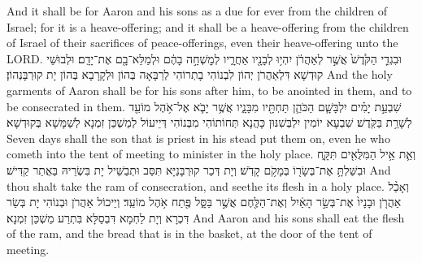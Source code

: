 {{And it shall be for Aaron and his sons as a due for ever from the children of Israel; for it is a heave-offering; and it shall be a heave-offering from the children of Israel of their sacrifices of peace-offerings, even their heave-offering unto the LORD.}{}
{וּבִגְדֵ֤י הַקֹּ֙דֶשׁ֙ אֲשֶׁ֣ר לְאַהֲרֹ֔ן יִהְי֥וּ לְבָנָ֖יו אַחֲרָ֑יו לְמׇשְׁחָ֣ה בָהֶ֔ם וּלְמַלֵּא־בָ֖ם אֶת־יָדָֽם׃
}
{וּלְבוּשֵׁי קוּדְשָׁא דִּלְאַהֲרֹן יְהוֹן לִבְנוֹהִי בָתְרוֹהִי לְרַבָּאָה בְּהוֹן וּלְקָרָבָא בְּהוֹן יָת קוּרְבָּנְהוֹן׃}
{And the holy garments of Aaron shall be for his sons after him, to be anointed in them, and to be consecrated in them.}{}
{שִׁבְעַ֣ת יָמִ֗ים יִלְבָּשָׁ֧ם הַכֹּהֵ֛ן תַּחְתָּ֖יו מִבָּנָ֑יו אֲשֶׁ֥ר יָבֹ֛א אֶל־אֹ֥הֶל מוֹעֵ֖ד לְשָׁרֵ֥ת בַּקֹּֽדֶשׁ׃
}
{שִׁבְעָא יוֹמִין יִלְבְּשִׁנּוּן כָּהֲנָא תְּחוֹתוֹהִי מִבְּנוֹהִי דְּיֵיעוֹל לְמַשְׁכַּן זִמְנָא לְשַׁמָּשָׁא בְּקוּדְשָׁא׃}
{Seven days shall the son that is priest in his stead put them on, even he who cometh into the tent of meeting to minister in the holy place.}{}
{וְאֵ֛ת אֵ֥יל הַמִּלֻּאִ֖ים תִּקָּ֑ח וּבִשַּׁלְתָּ֥ אֶת־בְּשָׂר֖וֹ בְּמָקֹ֥ם קָדֹֽשׁ׃
}
{וְיָת דְּכַר קוּרְבָּנַיָּא תִּסַּב וּתְבַשֵּׁיל יָת בִּשְׂרֵיהּ בַּאֲתַר קַדִּישׁ׃}
{And thou shalt take the ram of consecration, and seethe its flesh in a holy place.}{}
{וְאָכַ֨ל אַהֲרֹ֤ן וּבָנָיו֙ אֶת־בְּשַׂ֣ר הָאַ֔יִל וְאֶת־הַלֶּ֖חֶם אֲשֶׁ֣ר בַּסָּ֑ל פֶּ֖תַח אֹ֥הֶל מוֹעֵֽד׃
}
{וְיֵיכוֹל אַהֲרֹן וּבְנוֹהִי יָת בְּשַׂר דִּכְרָא וְיָת לַחְמָא דִּבְסַלָּא בִּתְרַע מַשְׁכַּן זִמְנָא׃}
{And Aaron and his sons shall eat the flesh of the ram, and the bread that is in the basket, at the door of the tent of meeting.}{}
}
